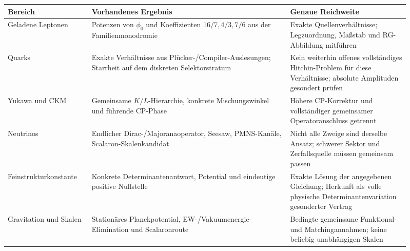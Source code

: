 \begin{longtable}{L{0.19\linewidth}L{0.45\linewidth}L{0.27\linewidth}}
\toprule
Bereich & Vorhandenes Ergebnis & Genaue Reichweite\\\midrule\endhead
Geladene Leptonen & Potenzen von $\phi_0$ und Koeffizienten $16/7,4/3,7/6$ aus der Familienmonodromie & Exakte Quellenverhältnisse; Legzuordnung, Maßstab und RG-Abbildung mitführen\\
Quarks & Exakte Verhältnisse aus Plücker-/Compiler-Auslesungen; Starrheit auf dem diskreten Selektorstratum & Kein weiterhin offenes vollständiges Hitchin-Problem für diese Verhältnisse; absolute Amplituden gesondert prüfen\\
Yukawa und CKM & Gemeinsame $K/L$-Hierarchie, konkrete Mischungswinkel und führende CP-Phase & Höhere CP-Korrektur und vollständiger gemeinsamer Operatoranschluss getrennt\\
Neutrinos & Endlicher Dirac-/Majoranaoperator, Seesaw, PMNS-Kanäle, Scalaron-Skalenkandidat & Nicht alle Zweige sind derselbe Ansatz; schwerer Sektor und Zerfallsquelle müssen gemeinsam passen\\
Feinstruktur\-konstante & Konkrete Determinantenantwort, Potential und eindeutige positive Nullstelle & Exakte Lösung der angegebenen Gleichung; Herkunft als volle physische Determinantenvariation gesonderter Vertrag\\
Gravitation und Skalen & Stationäres Planckpotential, EW-/Vakuumenergie-Elimination und Scalaronroute & Bedingte gemeinsame Funktional- und Matchingannahmen; keine beliebig unabhängigen Skalen\\
\bottomrule
\end{longtable}

